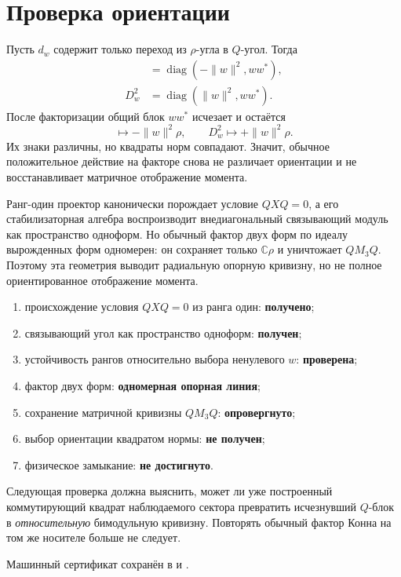 \section{Проверка ориентации}

Пусть \(d_w\) содержит только переход из \(\rho\)-угла в \(Q\)-угол. Тогда
\begin{align}
 [d_w,d_w^*]&=\operatorname{diag}(-\|w\|^2,ww^*),\\
 D_w^2&=\operatorname{diag}(\|w\|^2,ww^*).
\end{align}
После факторизации общий блок \(ww^*\) исчезает и остаётся
\begin{equation}
 [d_w,d_w^*]\longmapsto-\|w\|^2\rho,
 \qquad
 D_w^2\longmapsto+\|w\|^2\rho.
\end{equation}
Их знаки различны, но квадраты норм совпадают. Значит, обычное положительное
действие на факторе снова не различает ориентации и не восстанавливает
матричное отображение момента.

\begin{theorem}
Ранг-один проектор канонически порождает условие \(QXQ=0\), а его
стабилизаторная алгебра воспроизводит внедиагональный связывающий модуль как
пространство одноформ. Но обычный фактор двух форм по идеалу вырожденных
форм одномерен: он сохраняет только \(\mathbb C\rho\) и уничтожает
\(QM_3Q\). Поэтому эта геометрия выводит радиальную опорную кривизну, но не
полное ориентированное отображение момента.
\end{theorem}

\begin{protocol}
\begin{enumerate}
 \item происхождение условия \(QXQ=0\) из ранга один: \textbf{получено};
 \item связывающий угол как пространство одноформ: \textbf{получен};
 \item устойчивость рангов относительно выбора ненулевого \(w\):
 \textbf{проверена};
 \item фактор двух форм: \textbf{одномерная опорная линия};
 \item сохранение матричной кривизны \(QM_3Q\): \textbf{опровергнуто};
 \item выбор ориентации квадратом нормы: \textbf{не получен};
 \item физическое замыкание: \textbf{не достигнуто}.
\end{enumerate}
\end{protocol}

Следующая проверка должна выяснить, может ли уже построенный коммутирующий
квадрат наблюдаемого сектора превратить исчезнувший \(Q\)-блок в
\emph{относительную} бимодульную кривизну. Повторять обычный фактор Конна на
том же носителе больше не следует.

Машинный сертификат сохранён в
 и
.